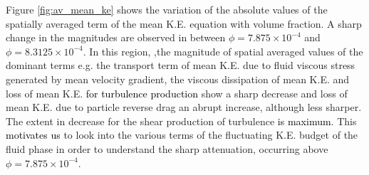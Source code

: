 \documentclass[aip,graphicx]{revtex4-1}
\begin{document}
Figure \ref{fig:av_mean_ke} shows the variation of the absolute values of the spatially averaged term of the mean K.E. equation with volume fraction. A sharp change in the magnitudes are observed in between $\phi=7.875\times10^{-4}$ and $\phi=8.3125\times10^{-4}$. In this region, ,the magnitude of spatial averaged values of the dominant terms e.g. the transport term of mean K.E. due to fluid viscous stress generated by mean velocity gradient, the viscous dissipation of mean K.E. and loss of mean K.E. \textcolor{black}{for turbulence production} show a sharp decrease and loss of mean K.E. due to particle reverse drag an abrupt increase, although less sharper. The extent in decrease for the shear production of turbulence \textcolor{black}{is maximum}. This \textcolor{black}{motivates us} to look into the various terms of the fluctuating K.E. budget of the fluid phase in order to understand the sharp attenuation, occurring above $\phi=7.875\times10^{-4}$.        
\end{document}
